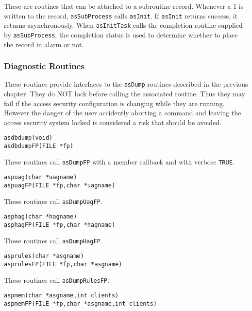 These are routines that can be attached to a subroutine record.
Whenever a 1 is written to the record, \verb|asSubProcess| calls \verb|asInit|.
If \verb|asInit| returns success, it returns asynchronously.
When \verb|asInitTask| calls the completion routine supplied by \verb|asSubProcess|, the completion status is used to determine whether to place the record in alarm or not.

\subsubsection{Diagnostic Routines}

These routines provide interfaces to the \verb|asDump| routines described in the previous chapter.
They do NOT lock before calling the associated routine.
Thus they may fail if the access security configuration is changing while they are running.
However the danger of the user accidently aborting a command and leaving the access security system locked is considered a risk that should be avoided.

\begin{verbatim}
asdbdump(void)
asdbdumpFP(FILE *fp)
\end{verbatim}

These routines call \verb|asDumpFP| with a member callback and with verbose \verb|TRUE|.

\begin{verbatim}
aspuag(char *uagname)
aspuagFP(FILE *fp,char *uagname)
\end{verbatim}

These routines call \verb|asDumpUagFP|.

\begin{verbatim}
asphag(char *hagname)
asphagFP(FILE *fp,char *hagname)
\end{verbatim}

These routines call \verb|asDumpHagFP|.

\begin{verbatim}
asprules(char *asgname)
asprulesFP(FILE *fp,char *asgname)
\end{verbatim}

These routines call \verb|asDumpRulesFP|.

\begin{verbatim}
aspmem(char *asgname,int clients)
aspmemFP(FILE *fp,char *asgname,int clients)
\end{verbatim}

